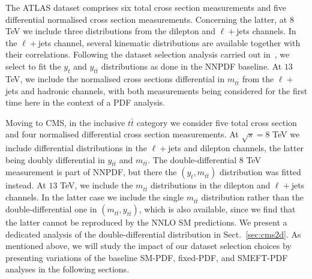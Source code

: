 \documentclass[withindex,glossary]{cam-thesis}
\begin{document}
 The ATLAS dataset comprises six total cross section measurements
 and five differential normalised cross section measurements.
 Concerning the latter, at $8$ TeV we include three distributions
 from the dilepton and $\ell+$jets channels.
%
 In the $\ell+$jets channel, several kinematic distributions are available
 together with their correlations.
 Following the dataset selection analysis carried out in~\cite{NNPDF:2021njg},
 we select to fit the $y_t$ and $y_{t\bar{t}}$ distributions as done in the
 NNPDF baseline.
%
 At $13$ TeV, we include the normalised cross sections
 differential in $m_{t\bar{t}}$ from the $\ell+$jets 
 and  hadronic channels, with both measurements being considered
 for the first time here in the context of a PDF analysis.

 Moving to CMS, in the inclusive $t\bar{t}$ category
 we consider five total cross section  and four normalised differential cross section
 measurements.
%
 At $\sqrt{s}=8$ TeV we include differential distributions in the 
 $\ell+$jets and dilepton channels, the latter being doubly differential
 in $y_{t\bar{t}}$ and $m_{t\bar{t}}$.
 The double-differential 8 TeV measurement is part of NNPDF, but there
 the $(y_{t},m_{t\bar{t}})$ distribution was fitted instead.
%
 At $13$ TeV, we include the $m_{t\bar{t}}$  distributions
 in the dilepton and $\ell+$jets channels.
 In the latter case we  include the single $m_{t\bar{t}}$ distribution
 rather than the double-differential one in $(m_{t\bar{t}},
 y_{t\bar{t}})$, which is also available, since we find that the
 latter cannot be reproduced by the NNLO SM predictions. We present a
 dedicated analysis of the double-differential distribution in Sect.~\ref{sec:cms2d}.
 As mentioned above, we will study the impact of our dataset selection choices
 by presenting variations of the baseline SM-PDF, fixed-PDF, and SMEFT-PDF analyses
 in the following sections.

\end{document}
